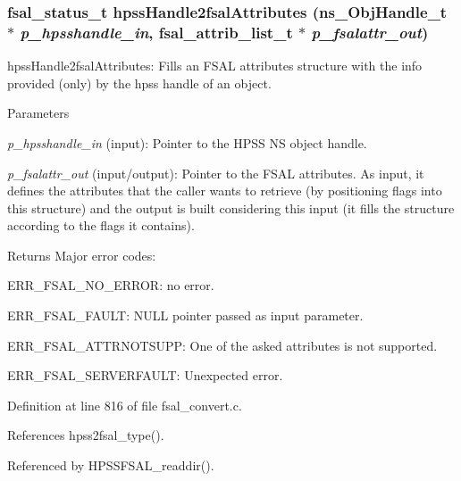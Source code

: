 \subsubsection[{hpssHandle2fsalAttributes}]{\setlength{\rightskip}{0pt plus 5cm}fsal\_\-status\_\-t hpssHandle2fsalAttributes (ns\_\-ObjHandle\_\-t $\ast$ {\em p\_\-hpsshandle\_\-in}, \/  fsal\_\-attrib\_\-list\_\-t $\ast$ {\em p\_\-fsalattr\_\-out})}\label{fsal__convert_8c_af1b20dd7b00c695d3da12699a8ab4a93}
hpssHandle2fsalAttributes: Fills an FSAL attributes structure with the info provided (only) by the hpss handle of an object.


\begin{DoxyParams}{Parameters}
\item[{\em p\_\-hpsshandle\_\-in}](input): Pointer to the HPSS NS object handle. \item[{\em p\_\-fsalattr\_\-out}](input/output): Pointer to the FSAL attributes. As input, it defines the attributes that the caller wants to retrieve (by positioning flags into this structure) and the output is built considering this input (it fills the structure according to the flags it contains).\end{DoxyParams}
\begin{DoxyReturn}{Returns}
Major error codes:
\begin{DoxyItemize}
\item ERR\_\-FSAL\_\-NO\_\-ERROR: no error.
\item ERR\_\-FSAL\_\-FAULT: NULL pointer passed as input parameter.
\item ERR\_\-FSAL\_\-ATTRNOTSUPP: One of the asked attributes is not supported.
\item ERR\_\-FSAL\_\-SERVERFAULT: Unexpected error. 
\end{DoxyItemize}
\end{DoxyReturn}


Definition at line 816 of file fsal\_\-convert.c.

References hpss2fsal\_\-type().

Referenced by HPSSFSAL\_\-readdir().